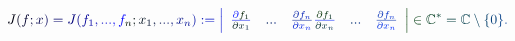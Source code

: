 \documentclass[12pt]{article}
\begin{document}
\makeatletter
\renewcommand*{\@textcolor}[3]{%
  \protect\leavevmode
  \begingroup
    \color#1{#2}#3%
  \endgroup
}
\makeatother
\begin{displaymath}
\mathcolor[RGB]{0,0,15}{J} \mathcolor[RGB]{0,0,30}{(} \mathcolor[RGB]{0,0,45}{f} \mathcolor[RGB]{0,0,60}{;} \mathcolor[RGB]{0,0,75}{x} \mathcolor[RGB]{0,0,90}{)} \mathcolor[RGB]{0,0,105}{=} \mathcolor[RGB]{0,0,120}{J} \mathcolor[RGB]{0,0,135}{(} \mathcolor[RGB]{0,0,150}{f} _ { \mathcolor[RGB]{0,0,165}{1} } \mathcolor[RGB]{0,0,180}{,} \mathcolor[RGB]{0,0,195}{.} \mathcolor[RGB]{0,0,210}{.} \mathcolor[RGB]{0,0,225}{.} \mathcolor[RGB]{0,0,240}{,} \mathcolor[RGB]{0,0,255}{f} _ { \mathcolor[RGB]{0,15,0}{n} } \mathcolor[RGB]{0,15,15}{;} \mathcolor[RGB]{0,15,30}{x} _ { \mathcolor[RGB]{0,15,45}{1} } \mathcolor[RGB]{0,15,60}{,} \mathcolor[RGB]{0,15,75}{.} \mathcolor[RGB]{0,15,90}{.} \mathcolor[RGB]{0,15,105}{.} \mathcolor[RGB]{0,15,120}{,} \mathcolor[RGB]{0,15,135}{x} _ { \mathcolor[RGB]{0,15,150}{n} } \mathcolor[RGB]{0,15,165}{)} \mathcolor[RGB]{0,15,180}{:} \mathcolor[RGB]{0,15,195}{=} \mathcolor[RGB]{0,15,210}{\left|} \begin{array} {ccccc} \mathcolor[RGB]{0,15,225}{\textstyle} { \mathcolor[RGB]{0,15,240}{\frac { \mathcolor[RGB]{0,15,255}{\partial} \mathcolor[RGB]{0,30,0}{f} _ { \mathcolor[RGB]{0,30,15}{1} } } { \mathcolor[RGB]{0,30,30}{\partial} \mathcolor[RGB]{0,30,45}{x} _ { \mathcolor[RGB]{0,30,60}{1} } } } } & \mathcolor[RGB]{0,30,75}{\textstyle} { \mathcolor[RGB]{0,30,90}{.} \mathcolor[RGB]{0,30,105}{.} \mathcolor[RGB]{0,30,120}{.} } & \mathcolor[RGB]{0,30,135}{\textstyle} { \mathcolor[RGB]{0,30,150}{\frac { \mathcolor[RGB]{0,30,165}{\partial} \mathcolor[RGB]{0,30,180}{f} _ { \mathcolor[RGB]{0,30,195}{n} } } { \mathcolor[RGB]{0,30,210}{\partial} \mathcolor[RGB]{0,30,225}{x} _ { \mathcolor[RGB]{0,30,240}{n} } } } \mathcolor[RGB]{0,30,255}{\frac { \mathcolor[RGB]{0,45,0}{\partial} \mathcolor[RGB]{0,45,15}{f} _ { \mathcolor[RGB]{0,45,30}{1} } } { \mathcolor[RGB]{0,45,45}{\partial} \mathcolor[RGB]{0,45,60}{x} _ { \mathcolor[RGB]{0,45,75}{n} } } } } & \mathcolor[RGB]{0,45,90}{\textstyle} { \mathcolor[RGB]{0,45,105}{.} \mathcolor[RGB]{0,45,120}{.} \mathcolor[RGB]{0,45,135}{.} } & \mathcolor[RGB]{0,45,150}{\textstyle} { \mathcolor[RGB]{0,45,165}{\frac { \mathcolor[RGB]{0,45,180}{\partial} \mathcolor[RGB]{0,45,195}{f} _ { \mathcolor[RGB]{0,45,210}{n} } } { \mathcolor[RGB]{0,45,225}{\partial} \mathcolor[RGB]{0,45,240}{x} _ { \mathcolor[RGB]{0,45,255}{n} } } } } \end{array} \mathcolor[RGB]{0,60,0}{\right|} \mathcolor[RGB]{0,60,15}{\in} \mathbb { \mathcolor[RGB]{0,60,30}{C} } ^ { \mathcolor[RGB]{0,60,45}{*} } \mathcolor[RGB]{0,60,60}{=} \mathbb { \mathcolor[RGB]{0,60,75}{C} } \mathcolor[RGB]{0,60,90}{\setminus} \mathcolor[RGB]{0,60,105}{\{} \mathcolor[RGB]{0,60,120}{0} \mathcolor[RGB]{0,60,135}{\}} \mathcolor[RGB]{0,60,150}{.}
\end{displaymath}
\end{document}
